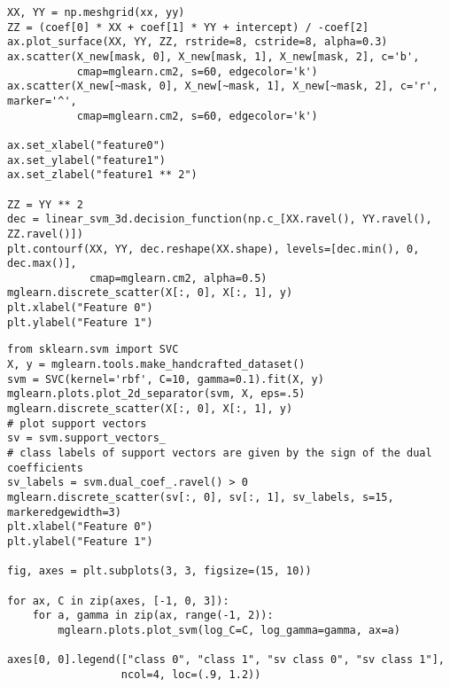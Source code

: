 \documentclass{beamer}
\begin{document}
\begin{frame}
\begin{verbatim}
XX, YY = np.meshgrid(xx, yy)
ZZ = (coef[0] * XX + coef[1] * YY + intercept) / -coef[2]
ax.plot_surface(XX, YY, ZZ, rstride=8, cstride=8, alpha=0.3)
ax.scatter(X_new[mask, 0], X_new[mask, 1], X_new[mask, 2], c='b',
           cmap=mglearn.cm2, s=60, edgecolor='k')
ax.scatter(X_new[~mask, 0], X_new[~mask, 1], X_new[~mask, 2], c='r', marker='^',
           cmap=mglearn.cm2, s=60, edgecolor='k')

ax.set_xlabel("feature0")
ax.set_ylabel("feature1")
ax.set_zlabel("feature1 ** 2")

ZZ = YY ** 2
dec = linear_svm_3d.decision_function(np.c_[XX.ravel(), YY.ravel(), ZZ.ravel()])
plt.contourf(XX, YY, dec.reshape(XX.shape), levels=[dec.min(), 0, dec.max()],
             cmap=mglearn.cm2, alpha=0.5)
mglearn.discrete_scatter(X[:, 0], X[:, 1], y)
plt.xlabel("Feature 0")
plt.ylabel("Feature 1")
\end{verbatim}

\begin{verbatim}
from sklearn.svm import SVC
X, y = mglearn.tools.make_handcrafted_dataset()                                                                  
svm = SVC(kernel='rbf', C=10, gamma=0.1).fit(X, y)
mglearn.plots.plot_2d_separator(svm, X, eps=.5)
mglearn.discrete_scatter(X[:, 0], X[:, 1], y)
# plot support vectors
sv = svm.support_vectors_
# class labels of support vectors are given by the sign of the dual coefficients
sv_labels = svm.dual_coef_.ravel() > 0
mglearn.discrete_scatter(sv[:, 0], sv[:, 1], sv_labels, s=15, markeredgewidth=3)
plt.xlabel("Feature 0")
plt.ylabel("Feature 1")

fig, axes = plt.subplots(3, 3, figsize=(15, 10))

for ax, C in zip(axes, [-1, 0, 3]):
    for a, gamma in zip(ax, range(-1, 2)):
        mglearn.plots.plot_svm(log_C=C, log_gamma=gamma, ax=a)
        
axes[0, 0].legend(["class 0", "class 1", "sv class 0", "sv class 1"],
                  ncol=4, loc=(.9, 1.2))

\end{verbatim}
\end{frame}
\end{document}
